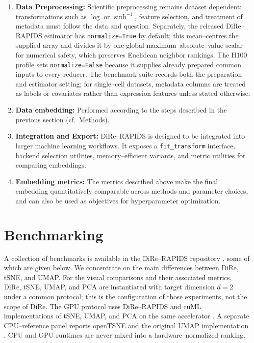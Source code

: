 \documentclass[11pt]{article}
\begin{document}
\begin{enumerate}
    \item \textbf{Data Preprocessing:} Scientific preprocessing remains dataset dependent: transformations such as $\log$ or $\sinh^{-1}$, feature selection, and treatment of metadata must follow the data and question. Separately, the released DiRe--RAPIDS estimator has \texttt{normalize=True} by default; this mean--centres the supplied array and divides it by one global maximum--absolute--value scalar for numerical safety, which preserves Euclidean neighbor rankings. The H100 profile sets \texttt{normalize=False} because it supplies already prepared common inputs to every reducer. The benchmark suite records both the preparation and estimator setting; for single--cell datasets, metadata columns are treated as labels or covariates rather than expression features unless stated otherwise.
    
    \item \textbf{Data embedding:} Performed according to the steps described in the previous section (cf.~Methods).  
    
    \item \textbf{Integration and Export:} DiRe--RAPIDS is designed to be integrated into larger machine learning workflows. It exposes a \texttt{fit\_transform} interface, backend selection utilities, memory--efficient variants, and metric utilities for comparing embeddings. 

    \item \textbf{Embedding metrics:} The metrics described above make the final embedding quantitatively comparable across methods and parameter choices, and can also be used as objectives for hyperparameter optimization.
\end{enumerate}

\section{Benchmarking}

A collection of benchmarks is available in the DiRe--RAPIDS repository
\cite{dire-rapids}, some of which are given below. We concentrate on the main
differences between DiRe, tSNE, and UMAP. For the visual comparisons and their
associated metrics, DiRe, tSNE, UMAP, and PCA are instantiated with target
dimension $d=2$ under a common protocol; this is the configuration of those
experiments, not the scope of DiRe. The GPU protocol uses DiRe--RAPIDS and cuML
implementations of tSNE, UMAP, and PCA on the same accelerator \cite{cuml}. A separate CPU--reference panel
reports openTSNE \cite{opentsne} and the original UMAP implementation
\cite{umap-git,umap}. CPU and GPU runtimes are never mixed into a
hardware--normalized ranking.
\end{document}
